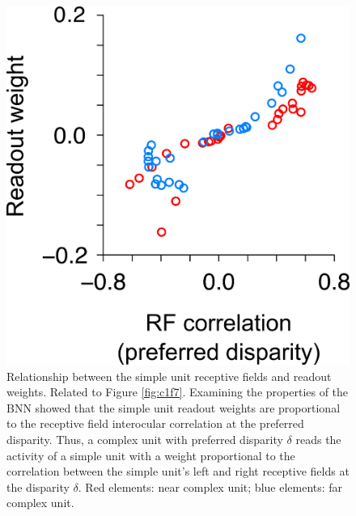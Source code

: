 \begin{figure}[!h]
  \centering
  \includegraphics{FigS6.png}
  \caption[Relationship between receptive field properties and readout weights.]{Relationship between the simple unit receptive fields and readout weights. Related to Figure \ref{fig:c1f7}. Examining the properties of the BNN showed that the simple unit readout weights are proportional to the receptive field interocular correlation at the preferred disparity. Thus, a complex unit with preferred disparity $\delta$ reads the activity of a simple unit with a weight proportional to the correlation between the simple unit's left and right receptive fields at the disparity $\delta$. Red elements: near complex unit; blue elements: far complex unit.}
  \label{fig:c1fs6}
\end{figure}

